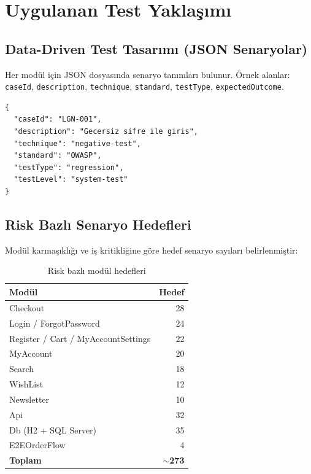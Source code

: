 \chapter{Uygulanan Test Yaklaşımı}

\section{Data-Driven Test Tasarımı (JSON Senaryolar)}
Her modül için JSON dosyasında senaryo tanımları bulunur. Örnek alanlar: \texttt{caseId}, \texttt{description}, \texttt{technique}, \texttt{standard}, \texttt{testType}, \texttt{expectedOutcome}.

\begin{lstlisting}[caption={Örnek senaryo alanları (login-scenarios.json)}]
{
  "caseId": "LGN-001",
  "description": "Gecersiz sifre ile giris",
  "technique": "negative-test",
  "standard": "OWASP",
  "testType": "regression",
  "testLevel": "system-test"
}
\end{lstlisting}

\section{Risk Bazlı Senaryo Hedefleri}
Modül karmaşıklığı ve iş kritikliğine göre hedef senaryo sayıları belirlenmiştir:

\begin{table}[H]
  \centering
  \caption{Risk bazlı modül hedefleri}
  \begin{tabular}{@{}lr@{}}
    \toprule
    \textbf{Modül} & \textbf{Hedef} \\
    \midrule
    Checkout & 28 \\
    Login / ForgotPassword & 24 \\
    Register / Cart / MyAccountSettings & 22 \\
    MyAccount & 20 \\
    Search & 18 \\
    WishList & 12 \\
    Newsletter & 10 \\
    Api & 32 \\
    Db (H2 + SQL Server) & 35 \\
    E2EOrderFlow & 4 \\
    \midrule
    \textbf{Toplam} & \textbf{$\sim$273} \\
    \bottomrule
  \end{tabular}
\end{table}

